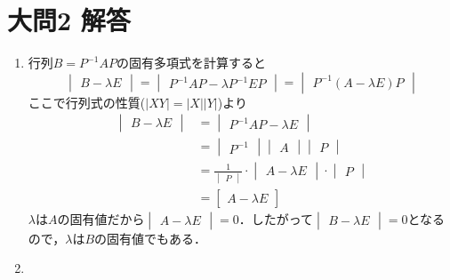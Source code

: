 \documentclass[dvipdfmx]{jsreport}
\begin{document}
\section{大問2 解答}
\begin{souanswer} %
\begin{enumerate}
	\item 行列$B= P^{-1}AP$の固有多項式を計算すると
\begin{equation*}
	\begin{vmatrix}B- \lambda E\end{vmatrix}= \begin{vmatrix}P^{-1}AP- \lambda P^{-1}EP\end{vmatrix}= \begin{vmatrix}P^{-1}(A- \lambda E)P\end{vmatrix}
\end{equation*}
	ここで行列式の性質($|XY|= |X||Y|$)より
\begin{align*}
	\begin{vmatrix}B- \lambda E\end{vmatrix}
	&= \begin{vmatrix}P^{-1}AP- \lambda E\end{vmatrix}\\
	&= \begin{vmatrix}P^{-1}\end{vmatrix}\begin{vmatrix}A\end{vmatrix}\begin{vmatrix}P\end{vmatrix}\\
	&= \frac{1}{\begin{vmatrix}P\end{vmatrix}}\cdot\begin{vmatrix}A- \lambda E\end{vmatrix}\cdot \begin{vmatrix}P\end{vmatrix}\\
	&= \begin{bmatrix}A- \lambda E\end{bmatrix}
\end{align*}
	$\lambda$は$A$の固有値だから$\begin{vmatrix}A- \lambda E\end{vmatrix}= 0$．したがって$\begin{vmatrix}B- \lambda E\end{vmatrix}= 0$となるので，$\lambda$は$B$の固有値でもある．
	\item 
{}
\end{enumerate}
\end{souanswer}
\end{document}

